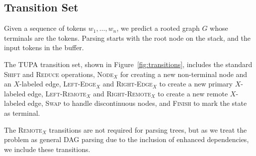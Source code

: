 \documentclass[11pt,a4paper]{article}
\begin{document}
\subsection{Transition Set}\label{sec:transition_set}
Given a sequence of tokens $w_1, \ldots, w_n$,
we predict a rooted graph $G$ whose terminals are the tokens.
Parsing starts with the root node on the stack,
and the input tokens in the buffer.

The TUPA transition set, shown in Figure~\ref{fig:transitions}, includes
the standard \textsc{Shift} and \textsc{Reduce} operations,
\textsc{Node$_X$} for creating a new non-terminal node and an $X$-labeled edge,
\textsc{Left-Edge$_X$} and \textsc{Right-Edge$_X$} to create a new primary $X$-labeled edge,
\textsc{Left-Remote$_X$} and \textsc{Right-Remote$_X$} to create a new remote $X$-labeled edge,
\textsc{Swap} to handle discontinuous nodes,
and \textsc{Finish} to mark the state as terminal.

The \textsc{Remote$_X$} transitions are not required for parsing trees,
but as we treat the problem as general DAG parsing due to the inclusion of enhanced dependencies,
we include these transitions.
\end{document}
